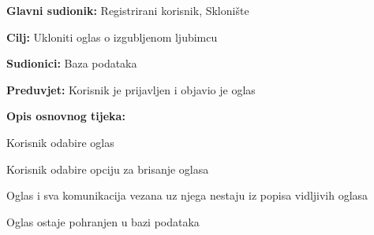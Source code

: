 					\pagebreak
					\noindent {}
					\begin{packed_item}
						
						\item \textbf{Glavni sudionik: }Registrirani korisnik, Sklonište
						\item  \textbf{Cilj:} Ukloniti oglas o izgubljenom ljubimcu
						\item  \textbf{Sudionici:} Baza podataka
						\item  \textbf{Preduvjet:} Korisnik je prijavljen i objavio je oglas
						\item  \textbf{Opis osnovnog tijeka:}
						
						\item[] \begin{packed_enum}
							
							\item Korisnik odabire oglas
							\item Korisnik odabire opciju za brisanje oglasa
							\item Oglas i sva komunikacija vezana uz njega nestaju iz popisa vidljivih oglasa
							\item Oglas ostaje pohranjen u bazi podataka
						\end{packed_enum}
						
					\end{packed_item}
					
